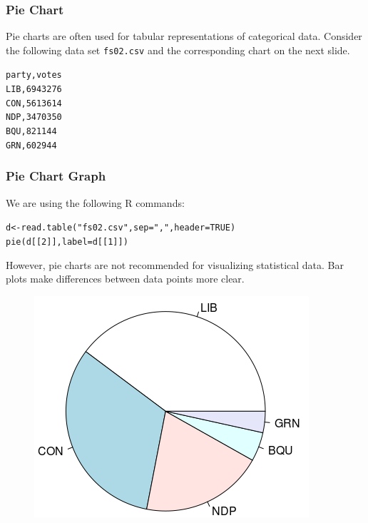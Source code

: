 \documentclass[xcolor=dvipsnames]{beamer}
\begin{document}
\begin{frame}
  \frametitle{Pie Chart}
Pie charts are often used for tabular representations of categorical
data. Consider the following data set \texttt{fs02.csv} and the
corresponding chart on the next slide.
\begin{alltt}
\small
party,votes\newline
LIB,6943276\newline
CON,5613614\newline
NDP,3470350\newline
BQU,821144\newline
GRN,602944
\end{alltt}
\end{frame}

\begin{frame}
  \frametitle{Pie Chart Graph}
We are using the following R commands: 
\begin{alltt}
\small
d<-read.table("fs02.csv",sep=",",header=TRUE)\newline
pie(d[[2]],label=d[[1]])
\end{alltt}

However, pie charts are not recommended for visualizing statistical
data. Bar plots make differences between data points more clear.
\begin{figure}[h]
\includegraphics[scale=.5]{./pie.png}
\end{figure}
\end{frame}
\end{document}
